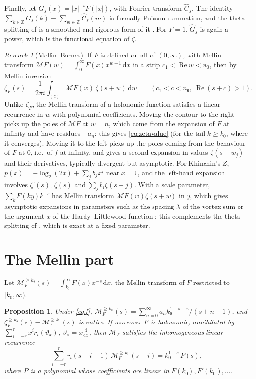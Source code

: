 \documentclass[11pt,reqno]{amsart}
\newtheorem{proposition}[theorem]{Proposition}
\theoremstyle{definition}
\theoremstyle{remark}
\newtheorem{remark}[theorem]{Remark}
\newcommand{\dd}{\,\mathrm{d}}
\newcommand{\ZZ}{\mathbb{Z}}
\begin{document}
Finally, let $G_s(x) = |x|^{-s}F(|x|)$, with Fourier transform $\widehat G_s$. The identity
$\sum_{k\in\ZZ}G_s(k) = \sum_{m\in\ZZ}\widehat G_s(m)$ is formally Poisson summation, and the theta splitting of
\cite[Theorem~3.2]{Joh26} is a smoothed and rigorous form of it \cite[Remark~3.4]{Joh26}. For $F = 1$,
$\widehat G_s$ is again a power, which is the functional equation of $\zeta$.

\begin{remark}[Mellin--Barnes]\label{rem:mb}
If $F$ is defined on all of $(0,\infty)$, with Mellin transform $\mathcal M F(w) = \int_0^\infty F(x)x^{w-1}\dd x$ in a strip
$c_1 < \operatorname{Re}w < n_0$, then by Mellin inversion
\[
  \zeta_F(s) = \frac1{2\pi i}\int_{(c)}\mathcal MF(w)\,\zeta(s+w)\dd w \qquad (c_1 < c < n_0,\ \operatorname{Re}(s+c) > 1).
\]
Unlike $\zeta_F$, the Mellin transform of a holonomic function satisfies a linear recurrence in $w$ with polynomial
coefficients. Moving the contour to the right picks up the poles of $\mathcal MF$ at $w = n$, which come from the
expansion of $F$ at infinity and have residues $-a_n$: this gives \eqref{eq:zetavalue} (for the tail $k \ge k_0$, where
it converges). Moving it to the left picks up the poles coming from the behaviour of $F$ at $0$, i.e.\ of $f$ at
infinity, and gives a second expansion in values $\zeta(s - w_j)$ and their derivatives, typically divergent but
asymptotic. For Khinchin's $Z$, $p(x) = -\log_2(2x) + \sum_jb_jx^j$ near $x = 0$, and the left-hand expansion involves
$\zeta'(s)$, $\zeta(s)$ and $\sum_jb_j\zeta(s-j)$. With a scale parameter, $\sum_kF(ky)k^{-s}$ has Mellin transform
$\mathcal MF(w)\zeta(s+w)$ in $y$, which gives asymptotic expansions in parameters such as the spacing $\lambda$ of the
vortex sum or the argument $x$ of the Hardy--Littlewood function \cite{FGD95,Kat97}; this complements
the theta splitting of \cite[Theorem~3.2]{Joh26}, which is exact at a fixed parameter.
\end{remark}


\section{The Mellin part}
Let $\mathcal M_F^{\ge k_0}(s) = \int_{k_0}^\infty F(x)x^{-s}\dd x$, the Mellin transform of $F$ restricted to $[k_0,\infty)$.

\begin{proposition}\label{prop:mellin}
Under \eqref{eq:f}, $\mathcal M_F^{\ge k_0}(s) = \sum_{n=0}^{\infty} a_n k_0^{1-s-n}/(s+n-1)$, and $\zeta_F^{\ge k_0}(s) - \mathcal M_F^{\ge k_0}(s)$ is entire.
If moreover $F$ is holonomic, annihilated by $\sum_{i=-r}^{r} x^ir_i(\vartheta_x)$, $\vartheta_x = x\frac{\mathrm{d}}{\mathrm{d}x}$, then $\mathcal M_F$
satisfies the inhomogeneous linear recurrence
\[
  \sum_{i=-r}^{r} r_i(s-i-1)\,\mathcal M_F^{\ge k_0}(s-i) = k_0^{1-s}\,P(s),
\]
where $P$ is a polynomial whose coefficients are linear in $F(k_0), F'(k_0), \dots$.
\end{proposition}
\end{document}
